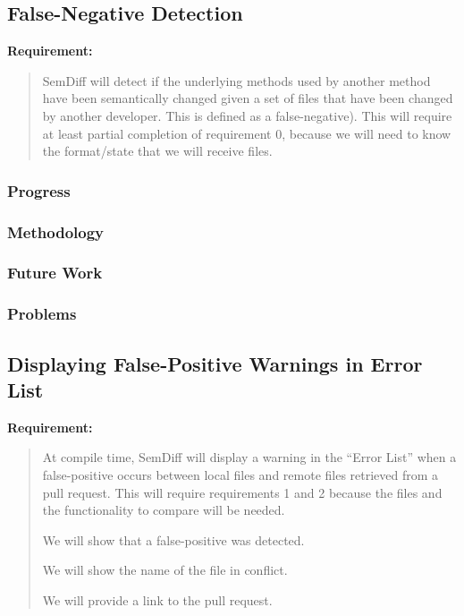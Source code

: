 \documentclass[draftclsnofoot,onecolumn]{IEEEtran}
\begin{document}
\subsection{False-Negative Detection}

\textbf{Requirement:}

\begin{quote}

SemDiff will detect if the underlying methods used by another method have been semantically changed given a set of files that have been changed by another developer. This is defined as a false-negative). This will require at least partial completion of requirement 0, because we will need to know the format/state that we will receive files.

\end{quote}

\subsubsection{Progress}

\subsubsection{Methodology}

\subsubsection{Future Work}

\subsubsection{Problems}






\subsection{Displaying False-Positive Warnings in Error List}

\textbf{Requirement:}

\begin{quote}

At compile time, SemDiff will display a warning in the “Error List” when a false-positive occurs between local files and remote files retrieved from a pull request. This will require requirements 1 and 2 because the files and the functionality to compare will be needed.

We will show that a false-positive was detected.

We will show the name of the file in conflict.

We will provide a link to the pull request.

\end{quote}
\end{document}
